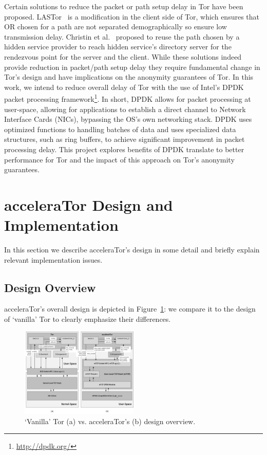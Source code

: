\documentclass[conference]{IEEEtran}
\begin{document}
Certain solutions to reduce the packet or path setup delay in Tor have been proposed. LASTor~\cite{6679287} is a modification in the client side of Tor, which ensures that OR chosen for a path are not separated demographically so ensure low transmission delay. Christin et al.~\cite{Christin2013} proposed to reuse the path chosen by a hidden service provider to reach hidden service's directory server for the rendezvous point for the server and the client. While these solutions indeed provide reduction in packet/path setup delay they require fundamental change in Tor's design and have  implications on the anonymity guarantees of Tor. In this work, we intend to reduce overall delay of Tor with the use of Intel's DPDK packet processing framework\footnote{\url{http://dpdk.org/}}. In short, DPDK allows for packet processing at user-space, allowing for applications to establish a direct channel to Network Interface Cards (NICs), bypassing the OS's own networking stack. DPDK uses optimized functions to handling batches of data and uses specialized data structures, such as ring buffers, to achieve significant improvement in packet processing delay. This project explores benefits of DPDK translate to better performance for Tor and the impact of this approach on Tor's anonymity guarantees.

\section{acceleraTor Design and Implementation}
\label{sec:design}

In this section we describe acceleraTor's design in some detail and briefly 
explain relevant implementation issues.

\subsection{Design Overview}
\label{subsec:design-overview}

acceleraTor's overall design is depicted in Figure~\ref{fig:accelerator-design}: we 
compare it to the design of `vanilla' Tor to clearly emphasize their differences.

\begin{figure}[h!]

    \centering
    \includegraphics[width=0.50\textwidth]{figures/design.png}
    \cprotect\caption{`Vanilla' Tor (a) vs. acceleraTor's (b) design overview.}
    \label{fig:accelerator-design}

\end{figure}
\end{document}
